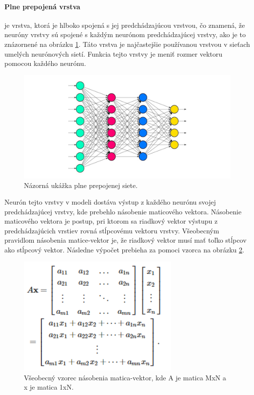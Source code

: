 \paragraph{Plne prepojená vrstva} je vrstva, ktorá je hlboko spojená s jej predchádzajúcou vrstvou, čo znamená, že neuróny vrstvy sú spojené s každým neurónom predchádzajúcej vrstvy, ako je to znázornené na obrázku \ref{dense_layer}. Táto vrstva je najčastejšie používanou vrstvou v sieťach umelých neurónových sietí. Funkcia tejto vrstvy je meniť rozmer vektoru pomocou každého neurónu.
\begin{figure}[!htbp]
  \centering
  \includegraphics[width=12cm]{img/dense_layer.png}
  \caption{Názorná ukážka plne prepojenej siete.}
  \label{dense_layer}
\end{figure}
Neurón tejto vrstvy v modeli dostáva výstup z každého neurónu svojej predchádzajúcej vrstvy, kde prebehlo násobenie maticového vektora. Násobenie maticového vektora je postup, pri ktorom sa riadkový vektor výstupu z predchádzajúcich vrstiev rovná stĺpcovému vektoru vrstvy. Všeobecným pravidlom násobenia matice-vektor je, že riadkový vektor musí mať toľko stĺpcov ako stĺpcový vektor. Následne výpočet prebieha za pomoci vzorca na obrázku \ref{maticavektor}.

\begin{figure}[!htbp]
  \centering
  \includegraphics[width=8cm]{img/dense.png}
  \caption{Všeobecný vzorec násobenia matica-vektor, kde A je matica MxN a x je matica 1xN.}
  \label{maticavektor}
\end{figure}

